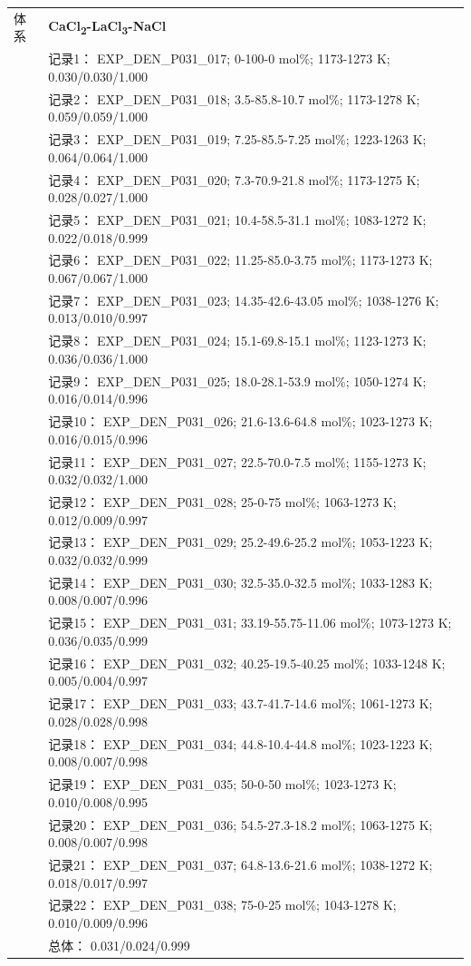 \documentclass[12pt]{article}
\begin{document}
{\begin{longtable}[]{@{}
  >{\raggedright\arraybackslash}p{}
  >{\raggedright\arraybackslash}p{}@{}}
\midrule
体系 & \textbf{CaCl\textsubscript{2}-LaCl\textsubscript{3}-NaCl} \\
 & 记录1： EXP\_DEN\_P031\_017; 0-100-0 mol\%; 1173-1273 K; 0.030/0.030/1.000 \\
 & 记录2： EXP\_DEN\_P031\_018; 3.5-85.8-10.7 mol\%; 1173-1278 K; 0.059/0.059/1.000 \\
 & 记录3： EXP\_DEN\_P031\_019; 7.25-85.5-7.25 mol\%; 1223-1263 K; 0.064/0.064/1.000 \\
 & 记录4： EXP\_DEN\_P031\_020; 7.3-70.9-21.8 mol\%; 1173-1275 K; 0.028/0.027/1.000 \\
 & 记录5： EXP\_DEN\_P031\_021; 10.4-58.5-31.1 mol\%; 1083-1272 K; 0.022/0.018/0.999 \\
 & 记录6： EXP\_DEN\_P031\_022; 11.25-85.0-3.75 mol\%; 1173-1273 K; 0.067/0.067/1.000 \\
 & 记录7： EXP\_DEN\_P031\_023; 14.35-42.6-43.05 mol\%; 1038-1276 K; 0.013/0.010/0.997 \\
 & 记录8： EXP\_DEN\_P031\_024; 15.1-69.8-15.1 mol\%; 1123-1273 K; 0.036/0.036/1.000 \\
 & 记录9： EXP\_DEN\_P031\_025; 18.0-28.1-53.9 mol\%; 1050-1274 K; 0.016/0.014/0.996 \\
 & 记录10： EXP\_DEN\_P031\_026; 21.6-13.6-64.8 mol\%; 1023-1273 K; 0.016/0.015/0.996 \\
 & 记录11： EXP\_DEN\_P031\_027; 22.5-70.0-7.5 mol\%; 1155-1273 K; 0.032/0.032/1.000 \\
 & 记录12： EXP\_DEN\_P031\_028; 25-0-75 mol\%; 1063-1273 K; 0.012/0.009/0.997 \\
 & 记录13： EXP\_DEN\_P031\_029; 25.2-49.6-25.2 mol\%; 1053-1223 K; 0.032/0.032/0.999 \\
 & 记录14： EXP\_DEN\_P031\_030; 32.5-35.0-32.5 mol\%; 1033-1283 K; 0.008/0.007/0.996 \\
 & 记录15： EXP\_DEN\_P031\_031; 33.19-55.75-11.06 mol\%; 1073-1273 K; 0.036/0.035/0.999 \\
 & 记录16： EXP\_DEN\_P031\_032; 40.25-19.5-40.25 mol\%; 1033-1248 K; 0.005/0.004/0.997 \\
 & 记录17： EXP\_DEN\_P031\_033; 43.7-41.7-14.6 mol\%; 1061-1273 K; 0.028/0.028/0.998 \\
 & 记录18： EXP\_DEN\_P031\_034; 44.8-10.4-44.8 mol\%; 1023-1223 K; 0.008/0.007/0.998 \\
 & 记录19： EXP\_DEN\_P031\_035; 50-0-50 mol\%; 1023-1273 K; 0.010/0.008/0.995 \\
 & 记录20： EXP\_DEN\_P031\_036; 54.5-27.3-18.2 mol\%; 1063-1275 K; 0.008/0.007/0.998 \\
 & 记录21： EXP\_DEN\_P031\_037; 64.8-13.6-21.6 mol\%; 1038-1272 K; 0.018/0.017/0.997 \\
 & 记录22： EXP\_DEN\_P031\_038; 75-0-25 mol\%; 1043-1278 K; 0.010/0.009/0.996 \\
 & 总体： 0.031/0.024/0.999  \\


\end{longtable}}
\end{document}
